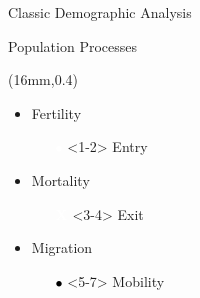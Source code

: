 \documentclass[10pt]{beamer}
\newcommand{\death}[1]{{\textcolor{white}{#1}}}
\newcommand{\mob}[1]{{\textcolor{black}{#1}}}
\newcommand{\birth}[1]{{\textcolor{white}{#1}}}
\begin{document}
\begin{frame}[t]{Classic Demographic Analysis}

\begin{block}{}
\centering
Population Processes
\end{block}


\begin{textblock*}{42mm}(16mm,0.4\textheight)
\begin{block}{}
\begin{itemize}
\item<1-2> Fertility
\begin{itemize}
\item[\birth{$\bullet$}]<1-2> Entry
\end{itemize}

\item<3-4> Mortality
\begin{itemize}
\item[\death{\textbf{X}}]<3-4> Exit
\end{itemize}
\item<5-7> Migration 
\begin{itemize}
\item[\mob{$\bullet$}]<5-7> Mobility
\end{itemize}
\end{itemize}
\end{block}
\end{textblock*}


\end{frame}
\end{document}

